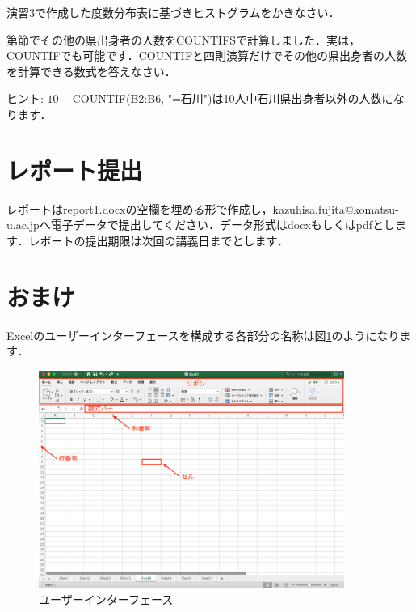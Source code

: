 \practice
 演習3で作成した度数分布表に基づきヒストグラムをかきなさい．

\practice
第節でその他の県出身者の人数をCOUNTIFSで計算しました．実は，COUNTIFでも可能です．COUNTIFと四則演算だけでその他の県出身者の人数を計算できる数式を答えなさい．

ヒント: $10-$COUNTIF(B2:B6, "=石川")は10人中石川県出身者以外の人数になります．

\section{レポート提出}

レポートはreport1.docxの空欄を埋める形で作成し，kazuhisa.fujita@komatsu-u.ac.jpへ電子データで提出してください．データ形式はdocxもしくはpdfとします．レポートの提出期限は次回の講義日までとします．

\section{おまけ}

Excelのユーザーインターフェースを構成する各部分の名称は図\ref{fig:ui}のようになります．

\begin{figure}[htbp]
    \centering
    \includegraphics[width=10cm]{chap1/ui.png}
    \caption{ユーザーインターフェース}
    \label{fig:ui}
\end{figure}
